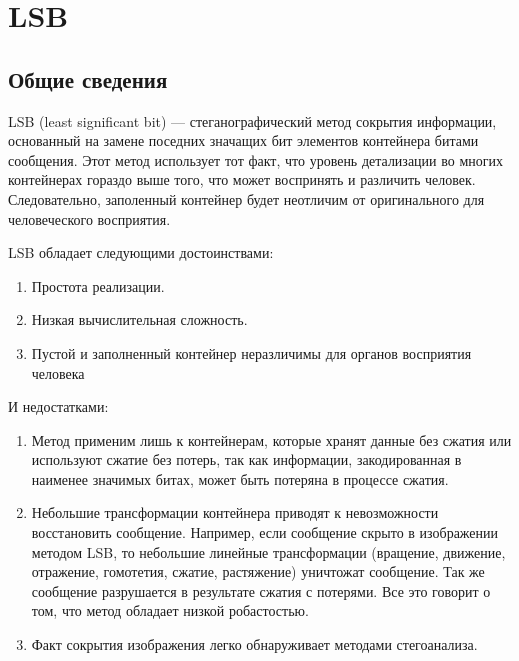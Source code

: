 \chapter{LSB}
\section{Общие сведения}
LSB (least significant bit) --- стеганографический метод сокрытия информации, основанный на замене поседних значащих бит
элементов контейнера битами сообщения. Этот метод использует тот факт,
что уровень детализации во многих контейнерах гораздо выше того,
что может воспринять и различить человек. Следовательно,
заполенный контейнер будет неотличим от оригинального
для человеческого восприятия.

LSB обладает следующими достоинствами:
\begin{enumerate}
    \item Простота реализации.
    \item Низкая вычислительная сложность.
    \item Пустой и заполненный контейнер неразличимы для органов восприятия человека
\end{enumerate}
И недостатками:
\begin{enumerate}
    \item Метод применим лишь к контейнерам, которые хранят данные без сжатия или используют
    сжатие без потерь, так как информации, закодированная в наименее значимых битах, может
    быть потеряна в процессе сжатия.
    \item Небольшие трансформации контейнера приводят к невозможности восстановить сообщение.
    Например, если сообщение скрыто в изображении методом LSB, то небольшие линейные трансформации
    (вращение, движение, отражение, гомотетия, сжатие, растяжение) уничтожат сообщение. Так же
    сообщение разрушается в результате сжатия с потерями. Все это говорит о том, что метод обладает
    низкой робастостью.
    \item Факт сокрытия изображения легко обнаруживает методами стегоанализа.
\end{enumerate}


